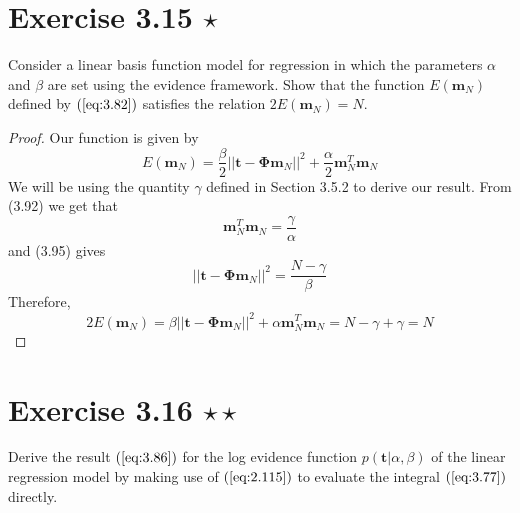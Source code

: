 \section*{Exercise 3.15 $\star$}
Consider a linear basis function model for regression in which the parameters
$\alpha$ and $\beta$ are set using the evidence framework. Show that the
function $E(\mathbf{m}_N)$ defined by $(\ref{eq:3.82})$ satisfies the relation
$2E(\mathbf{m}_N) = N$.

\vspace{1em}

\begin{proof}
    Our function is given by
    \begin{equation*}
        E(\mathbf{m}_N) = \frac{\beta}{2} ||\mathbf{t} - \mathbf{\Phi}\mathbf{m}_N||^2
        + \frac{\alpha}{2} \mathbf{m}_N^T\mathbf{m}_N
        \tag{3.82}\label{eq:3.82}
    \end{equation*}
    We will be using the quantity $\gamma$ defined in Section 3.5.2 to 
    derive our result. From (3.92) we get that
     \[
         \mathbf{m}_N^T\mathbf{m}_N = \frac{\gamma}{\alpha}
    \] 
    and (3.95) gives
    \[
        ||\mathbf{t} - \mathbf{\Phi}\mathbf{m}_N||^2 = \frac{N - \gamma}{\beta}
    \] 
    Therefore,
    \[
        2E(\mathbf{m}_N) 
        = \beta||\mathbf{t} - \mathbf{\Phi}\mathbf{m}_N||^2 + \alpha\mathbf{m}_N^T\mathbf{m}_N
        = N - \gamma + \gamma = N
    \] 
\end{proof}

\section*{Exercise 3.16 $\star \star$}
Derive the result $(\ref{eq:3.86})$ for the log evidence
function $p(\mathbf{t} | \alpha, \beta)$ of the linear
regression model by making use of $(\ref{eq:2.115})$ to
evaluate the integral $(\ref{eq:3.77})$ directly.

\vspace{1em}

